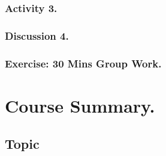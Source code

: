 \documentclass[11pt]{book}
\begin{document}
		\section{Activity 3.}
		
		\section{Discussion 4.}
		
		\section{Exercise: 30 Mins Group Work.}
		
		
\part{Course Summary.}
	\chapter{Topic}
\end{document}
